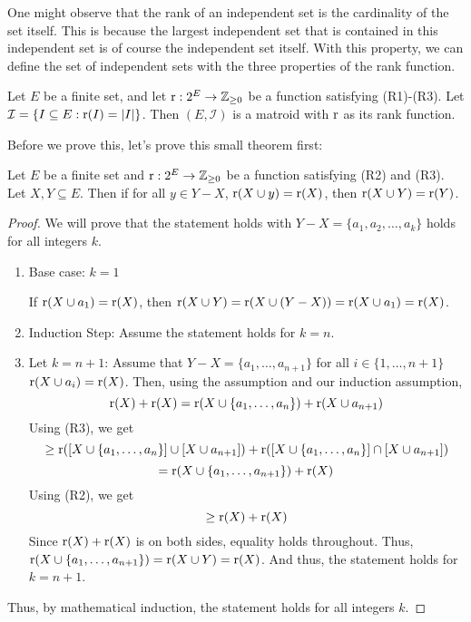 One might observe that the rank of an independent set is the cardinality of the set itself. This is because the largest independent set that is contained in this independent set is of course the independent set itself. With this property, we can define the set of independent sets with the three properties of the rank function.
\begin{theorem}
    Let $E$ be a finite set, and let $\operatorname{r} : 2^E \rightarrow \mathbb{Z}_{\geq0}$ be a function satisfying (R1)-(R3). Let $\mathcal{I} = \{ I\subseteq E : \operatorname{r}(I)=|I| \} $. Then $(E,\mathcal{I})$ is a matroid with $\operatorname{r}$ as its rank function.
\end{theorem}
Before we prove this, let's prove this small theorem first:
\begin{theorem}
\label{rankextension}
    Let $E$ be a finite set and $\operatorname{r}:2^E\rightarrow \mathbb{Z}_{\geq0}$ be a function satisfying (R2) and (R3). Let $X,Y\subseteq E$. Then if for all $y\in Y-X$, $\operatorname{r}(X\cup y)=\operatorname{r}(X)$, then $\operatorname{r}(X\cup Y)=\operatorname{r}(Y)$.
\end{theorem}
\begin{proof}
    We will prove that the statement holds with $Y-X = \{a_1,a_2,\dots,a_k\}$ holds for all integers $k$.
    \begin{enumerate}
        \item Base case: $k=1$

        If $\operatorname{r}(X\cup a_1)=\operatorname{r}(X)$, then $\operatorname{r}(X\cup Y)=\operatorname{r}(X\cup(Y-X))=\operatorname{r}(X\cup a_1)=\operatorname{r}(X)$.
        \item Induction Step: Assume the statement holds for $k=n$.
        \item Let $k=n+1$: Assume that $Y-X=\{a_1,\dots,a_{n+1}\}$ for all $i\in\{1,\dots,n+1\}$ $\operatorname{r}(X\cup a_i)=\operatorname{r}(X)$. Then, using the assumption and our induction assumption, 
        $$ \operatorname{r}(X)+\operatorname{r}(X) = \operatorname{r}(X\cup \{a_1,\dots,a_n\})+\operatorname{r}(X\cup a_{n+1}) $$
        Using (R3), we get
        $$ \geq \operatorname{r}([X\cup\{a_1,\dots,a_n\}]\cup [X\cup a_{n+1}]) + \operatorname{r}([X\cup\{a_1,\dots,a_n\}]\cap [X\cup a_{n+1}]) $$
        $$ = \operatorname{r}(X\cup\{a_1,\dots,a_{n+1}\}) + \operatorname{r}(X) $$
        Using (R2), we get
        $$ \geq \operatorname{r}(X)+\operatorname{r}(X) $$
        Since $\operatorname{r}(X)+\operatorname{r}(X)$ is on both sides, equality holds throughout. Thus, $\operatorname{r}(X\cup\{a_1,\dots,a_{n+1}\})=\operatorname{r}(X\cup Y)=\operatorname{r}(X)$. And thus, the statement holds for $k=n+1$.
    \end{enumerate}
    Thus, by mathematical induction, the statement holds for all integers $k$.
\end{proof}
